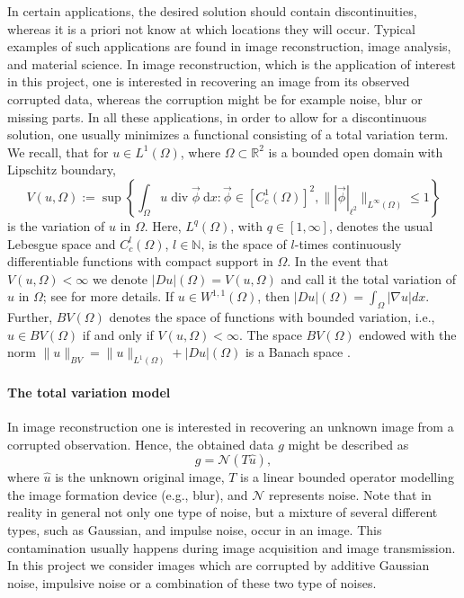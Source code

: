 \documentclass[enabledeprecatedfontcommands,cleardoublepage=empty,headsepline,twoside,11pt,DIV=15,BCOR=12mm,final]{scrartcl}
\newcommand{\N}{{\mathbb N}}
\newcommand{\R}{{\mathbb R}}
\begin{document}
In certain applications, the desired solution should contain discontinuities, whereas it is a priori not know at which locations they will occur. Typical examples of such applications are found in image reconstruction, image analysis, and material science. In image reconstruction, which is the application of interest in this project, one is interested in recovering an image from its observed corrupted data, whereas the corruption might be for example noise, blur or missing parts. %
 In all these applications, in order to allow for a discontinuous solution, one usually minimizes a functional consisting of a total variation term. We recall, that for $u\in L^1(\Omega)$, where $\Omega \subset \R^2$ is a bounded open domain with Lipschitz boundary,
$$
V(u,\Omega):=\sup\left\{\int_{\Omega} u \operatorname{div} \vec\phi \ \text{d}x : \vec\phi \in [C_c^1(\Omega)]^2, \|{|\vec\phi|_{\ell^2}}\|_{L^\infty(\Omega)} \leq 1\right\}
$$
is the variation of $u$ in $\Omega$. Here, $L^q(\Omega)$, with $q\in [1,\infty]$, denotes the usual Lebesgue space \cite{AdaFou} and $C_c^l(\Omega)$, $l\in \N$, is the space of $l$-times continuously differentiable functions with compact support in $\Omega$. In the event that $V(u,\Omega)<\infty$ we denote $|Du|(\Omega)=V(u,\Omega)$ and call it the total variation of $u$ in $\Omega$; see \cite{AmbFusPal, Giu} for more details. If $u\in W^{1,1}(\Omega)$, then $|Du|(\Omega)= \int_{\Omega}|\nabla u| dx$. Further, $BV(\Omega)$ denotes the space of functions with bounded variation, i.e., $u\in BV(\Omega)$ if and only if $V(u,\Omega)<\infty$. The space $BV(\Omega)$ endowed with the norm $\|u\|_{BV} = \|u\|_{L^1(\Omega)} + |Du|(\Omega)$ is a Banach space \cite{Giu}. 

\paragraph{The total variation model}

In image reconstruction one is interested in recovering an unknown image from a corrupted observation. Hence, the obtained data $g$ might be described as
\begin{equation}\label{eq:g}
g=\mathcal{N}(T\hat{u}),
\end{equation}
where $\hat{u}$ is the unknown original image, $T$ is a linear bounded operator modelling the image formation device (e.g., blur), and $\mathcal{N}$ represents noise. 
Note that in reality in general not only one type of noise, but a mixture of several different types, such as Gaussian, and impulse noise, occur in an image. This contamination usually happens during image acquisition and image transmission. In this project we consider images which are corrupted by additive Gaussian noise, impulsive noise or a combination of these two type of noises.
\end{document}
